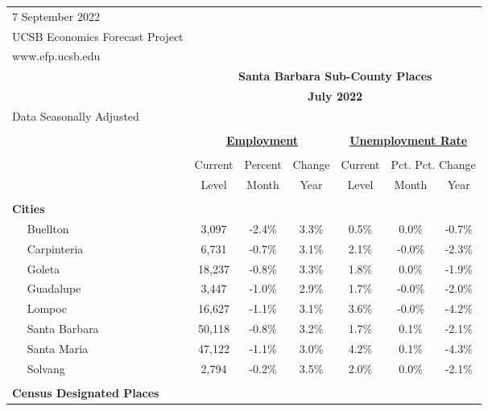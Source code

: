 \documentclass[12pt]{article}
\begin{document}
\begin{landscape}
\begin{table}
\begin{tabular}{|l|c|c|c||c|c|c|}
\multicolumn{1}{l}{\small 7 September 2022} & \multicolumn{6}{c}{} \\
\multicolumn{1}{l}{\small UCSB Economics Forecast Project} & \multicolumn{6}{c}{} \\
\multicolumn{1}{l}{\small www.efp.ucsb.edu} & \multicolumn{6}{c}{} \\
\multicolumn{1}{c}{} & \multicolumn{6}{c}{\large \textbf{Santa Barbara Sub-County Places}} \\
\multicolumn{1}{c}{} & \multicolumn{6}{c}{\large \textbf{July 2022}} \\
\multicolumn{7}{l}{\small Data Seasonally Adjusted} \\ \hline \hline
& \multicolumn{5}{c}{} & \\
& \multicolumn{3}{c}{\textbf{\underline{Employment}} } & \multicolumn{3}{c}{\textbf{\underline{Unemployment Rate}} } \vline \\
& \multicolumn{2}{c}{} & & \multicolumn{2}{c}{} & \\
& Current & \multicolumn{1}{r}{Percent} & Change & Current & \multicolumn{2}{c}{Pct. Pct. Change} \vline \\
& Level & Month & Year & Level & Month & Year \\ \hline
&&&&&& \\
\textbf{Cities} &&&&&& \\
$\quad$ Buellton & 3,097 & -2.4\% & 3.3\% & 0.5\% & 0.0\% & -0.7\% \\
$\quad$ Carpinteria & 6,731 & -0.7\% & 3.1\% & 2.1\% & -0.0\% & -2.3\% \\
$\quad$ Goleta & 18,237 & -0.8\% & 3.3\% & 1.8\% & 0.0\% & -1.9\% \\
$\quad$ Guadalupe & 3,447 & -1.0\% & 2.9\% & 1.7\% & -0.0\% & -2.0\% \\
$\quad$ Lompoc & 16,627 & -1.1\% & 3.1\% & 3.6\% & -0.0\% & -4.2\% \\
$\quad$ Santa Barbara & 50,118 & -0.8\% & 3.2\% & 1.7\% & 0.1\% & -2.1\% \\
$\quad$ Santa Maria & 47,122 & -1.1\% & 3.0\% & 4.2\% & 0.1\% & -4.3\% \\
$\quad$ Solvang & 2,794 & -0.2\% & 3.5\% & 2.0\% & 0.0\% & -2.1\% \\
&&&&&& \\
\textbf{Census Designated Places} &&&&&& \\

\end{tabular}
\end{table}
\end{landscape}
\end{document}
